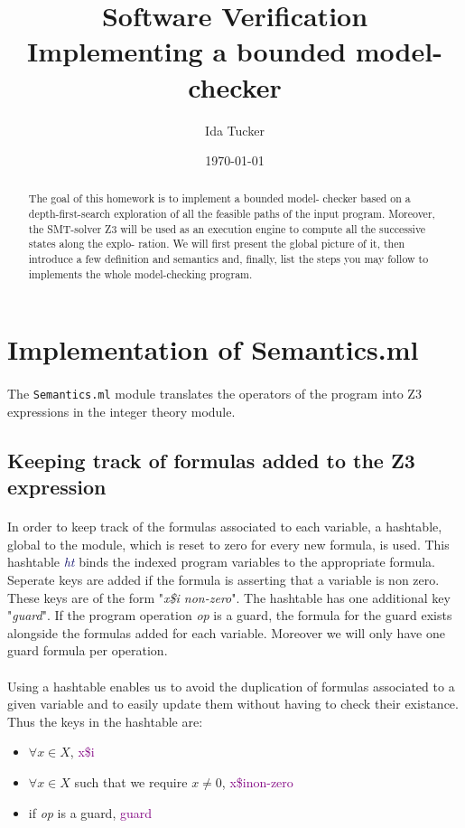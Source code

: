 \documentclass[letterpaper,12pt]{article}
\begin{document}
\title{Software Verification\\
Implementing a bounded model-checker}
\author{Ida Tucker}
\date{\today}
\maketitle

\begin{abstract}
The goal of this homework is to implement a bounded model-
checker based on a depth-first-search exploration of all the feasible paths
of the input program. Moreover, the SMT-solver Z3 will be used as an
execution engine to compute all the successive states along the explo-
ration. We will first present the global picture of it, then introduce a
few definition and semantics and, finally, list the steps you may follow
to implements the whole model-checking program.
\end{abstract}


\section{Implementation of Semantics.ml}
\paragraph{}
The \texttt{Semantics.ml} module translates the operators of the program into Z3 expressions in the integer theory module.
\subsection{Keeping track of formulas added to the Z3 expression}
\paragraph{}
In order to keep track of the formulas associated to each variable, a hashtable, global to the module, which is reset to zero for every new formula, is used. This hashtable \textit{\textcolor{MidnightBlue}{ht}} binds the indexed program variables to the appropriate formula.
Seperate keys are added if the formula is asserting that a variable is non zero. These keys are of the form "\textit{x\$i non-zero}".
The hashtable has one additional key "\textit{guard}". If the program operation \textit{op} is a guard, the formula for the guard exists alongside the formulas added for each variable. Moreover we will only have one guard formula per operation.
\paragraph{}
Using a hashtable enables us to avoid the duplication of formulas associated to a given variable and to easily update them without having to check their existance. 
Thus the keys in the hashtable are:
\begin{itemize}
\item $\forall x \in X$,  \textcolor{purple}{x\$i}
\item $\forall x \in X$ such that we require $x \neq 0$, \textcolor{purple}{x\$inon-zero}
\item if \textit{op} is a guard, \textcolor{purple}{guard}
\end{itemize}
\end{document}
